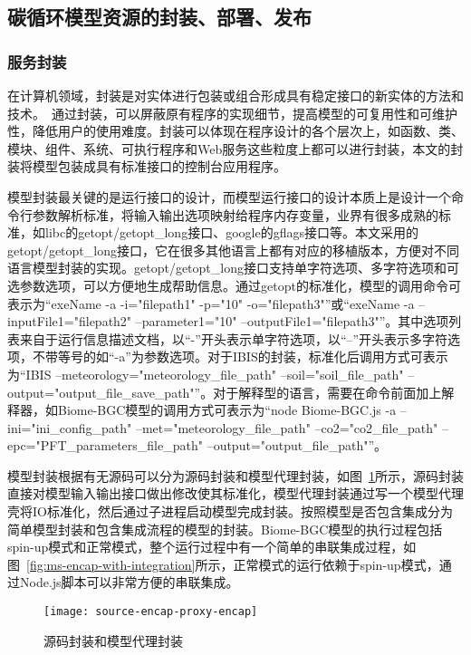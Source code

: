 \subsection{碳循环模型资源的封装、部署、发布}

\subsubsection{服务封装}
在计算机领域，封装是对实体进行包装或组合形成具有稳定接口的新实体的方法和技术。~\cite{胡迪2015地理模型的服务化封装方法研究}通过封装，可以屏蔽原有程序的实现细节，提高模型的可复用性和可维护性，降低用户的使用难度。封装可以体现在程序设计的各个层次上，如函数、类、模块、组件、系统、可执行程序和Web服务这些粒度上都可以进行封装，本文的封装将模型包装成具有标准接口的控制台应用程序。

模型封装最关键的是运行接口的设计，而模型运行接口的设计本质上是设计一个命令行参数解析标准，将输入输出选项映射给程序内存变量，业界有很多成熟的标准，如libc的getopt/getopt\_long接口、google的gflags接口等。本文采用的getopt/getopt\_long接口，它在很多其他语言上都有对应的移植版本，方便对不同语言模型封装的实现。getopt/getopt\_long接口支持单字符选项、多字符选项和可选参数选项，可以方便地生成帮助信息。通过getopt的标准化，模型的调用命令可表示为“exeName -a -i="filepath1" -p="10" -o="filepath3"”或“exeName -a --inputFile1="filepath2" --parameter1="10" --outputFile1="filepath3"”。其中选项列表来自于运行信息描述文档，以“-”开头表示单字符选项，以“--”开头表示多字符选项，不带等号的如“-a”为参数选项。对于IBIS的封装，标准化后调用方式可表示为“IBIS --meteorology="meteorology\_file\_path" --soil="soil\_file\_path" --output="output\_file\_save\_path"”。对于解释型的语言，需要在命令前面加上解释器，如Biome-BGC模型的调用方式可表示为“node Biome-BGC.js -a --ini="ini\_config\_path" --met="meteorology\_file\_path" --co2="co2\_file\_path" --epc="PFT\_parameters\_file\_path" --output="output\_file\_path"”。

模型封装根据有无源码可以分为源码封装和模型代理封装，如图~\ref{fig:source-encap-proxy-encap}所示，源码封装直接对模型输入输出接口做出修改使其标准化，模型代理封装通过写一个模型代理壳将IO标准化，然后通过子进程启动模型完成封装。按照模型是否包含集成分为简单模型封装和包含集成流程的模型的封装。Biome-BGC模型的执行过程包括spin-up模式和正常模式，整个运行过程中有一个简单的串联集成过程，如图~\ref{fig:ms-encap-with-integration}所示，正常模式的运行依赖于spin-up模式，通过Node.js脚本可以非常方便的串联集成。

\begin{figure}[!htbp]
    \centering
    \texttt{[image: source-encap-proxy-encap]}
    \caption{源码封装和模型代理封装}
    \label{fig:source-encap-proxy-encap}
\end{figure}

